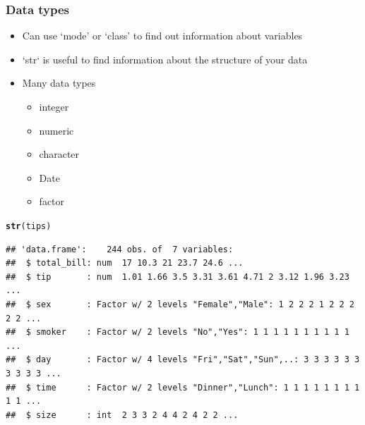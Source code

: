 \documentclass{beamer}\usepackage[]{graphicx}\usepackage[]{color}
\makeatletter
\newcommand{\hlstd}[1]{\textcolor[rgb]{0.345,0.345,0.345}{#1}}%
\newcommand{\hlkwd}[1]{\textcolor[rgb]{0.737,0.353,0.396}{\textbf{#1}}}%
\newenvironment{kframe}{%
 \def\at@end@of@kframe{}%
 \ifinner\ifhmode%
  \def\at@end@of@kframe{\end{minipage}}%
  \begin{minipage}{\columnwidth}%
 \fi\fi%
 \def\FrameCommand##1{\hskip\@totalleftmargin \hskip-\fboxsep
 \colorbox{shadecolor}{##1}\hskip-\fboxsep
     \hskip-\linewidth \hskip-\@totalleftmargin \hskip\columnwidth}%
 \MakeFramed {\advance\hsize-\width
   \@totalleftmargin\z@ \linewidth\hsize
   \@setminipage}}%
 {\par\unskip\endMakeFramed%
 \at@end@of@kframe}
\newenvironment{knitrout}{}{} %
\makeatother
\begin{document}
\begin{frame}[fragile]
    \frametitle{Data types}
    \begin{itemize}
        \item Can use `mode' or `class' to find out information about variables
        \item `str` is useful to find information about the structure of your data
        \item Many data types
        \begin{itemize}
            \item integer
            \item numeric
            \item character
            \item Date
            \item factor
        \end{itemize}
    \end{itemize}


\begin{knitrout}\footnotesize
{}\color{fgcolor}\begin{kframe}
\begin{alltt}
\hlkwd{str}\hlstd{(tips)}
\end{alltt}
\begin{verbatim}
## 'data.frame':	244 obs. of  7 variables:
##  $ total_bill: num  17 10.3 21 23.7 24.6 ...
##  $ tip       : num  1.01 1.66 3.5 3.31 3.61 4.71 2 3.12 1.96 3.23 ...
##  $ sex       : Factor w/ 2 levels "Female","Male": 1 2 2 2 1 2 2 2 2 2 ...
##  $ smoker    : Factor w/ 2 levels "No","Yes": 1 1 1 1 1 1 1 1 1 1 ...
##  $ day       : Factor w/ 4 levels "Fri","Sat","Sun",..: 3 3 3 3 3 3 3 3 3 3 ...
##  $ time      : Factor w/ 2 levels "Dinner","Lunch": 1 1 1 1 1 1 1 1 1 1 ...
##  $ size      : int  2 3 3 2 4 4 2 4 2 2 ...
\end{verbatim}
\end{kframe}
\end{knitrout}

\end{frame}
\end{document}
